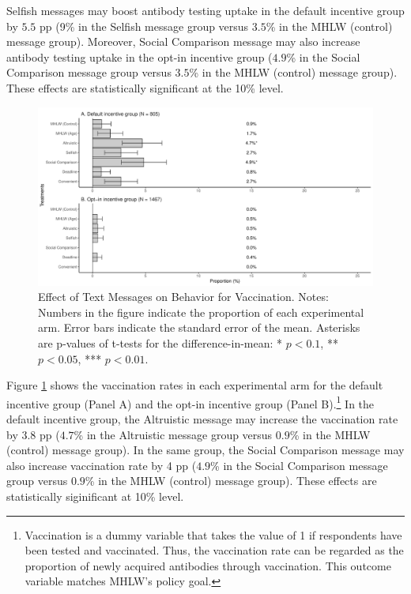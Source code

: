\documentclass[
]{article}
\begin{document}
Selfish messages may boost antibody testing uptake in the default incentive group by \(5.5\) pp (9\% in the Selfish message group versus \(3.5\)\% in the MHLW (control) message group). Moreover, Social Comparison message may also increase antibody testing uptake in the opt-in incentive group (\(4.9\)\% in the Social Comparison message group versus \(3.5\)\% in the MHLW (control) message group). These effects are statistically significant at the 10\% level.

\begin{figure}[t]
\includegraphics{discussion-paper_files/figure-latex/ttest-act-vacc-1} \caption{Effect of Text Messages on Behavior for Vaccination. Notes: Numbers in the figure indicate the proportion of each experimental arm. Error bars indicate the standard error of the mean. Asterisks are p-values of t-tests for the difference-in-mean: * $p < 0.1$, ** $p < 0.05$, *** $p < 0.01$.}\label{fig:ttest-act-vacc}
\end{figure}

Figure \ref{fig:ttest-act-vacc} shows the vaccination rates in each experimental arm for the default incentive group (Panel A) and the opt-in incentive group (Panel B).\footnote{Vaccination is a dummy variable that takes the value of 1 if respondents have been tested and vaccinated. Thus, the vaccination rate can be regarded as the proportion of newly acquired antibodies through vaccination. This outcome variable matches MHLW's policy goal.} In the default incentive group, the Altruistic message may increase the vaccination rate by \(3.8\) pp (\(4.7\)\% in the Altruistic message group versus \(0.9\)\% in the MHLW (control) message group). In the same group, the Social Comparison message may also increase vaccination rate by 4 pp (\(4.9\)\% in the Social Comparison message group versus \(0.9\)\% in the MHLW (control) message group). These effects are statistically siginificant at 10\% level.
\end{document}
